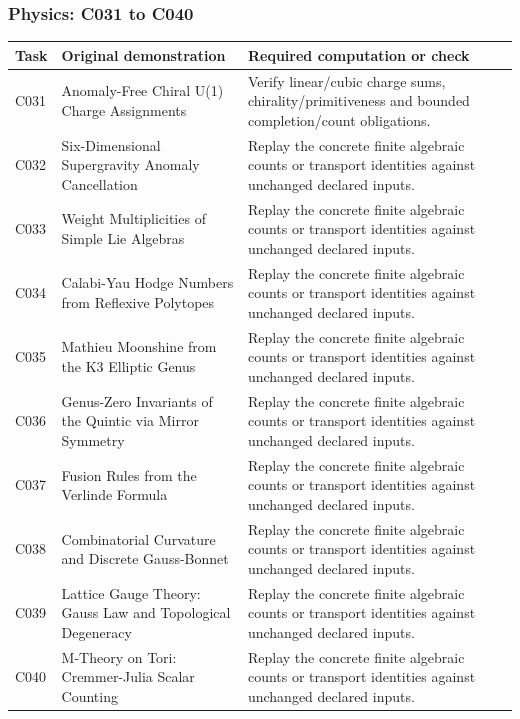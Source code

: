 \documentclass[
  11pt,
]{article}
\begin{document}
\subsubsection{Physics: C031 to C040}\label{physics-c031-to-c040}

\begin{longtable}[]{@{}
  >{\raggedright\arraybackslash}p{}
  >{\raggedright\arraybackslash}p{}
  >{\raggedright\arraybackslash}p{}@{}}
\toprule\noalign{}
\begin{minipage}[b]{\linewidth}\raggedright
Task
\end{minipage} & \begin{minipage}[b]{\linewidth}\raggedright
Original demonstration
\end{minipage} & \begin{minipage}[b]{\linewidth}\raggedright
Required computation or check
\end{minipage} \\
\midrule\noalign{}
\endhead
\bottomrule\noalign{}
\endlastfoot
C031 & Anomaly-Free Chiral U(1) Charge Assignments & Verify linear/cubic
charge sums, chirality/primitiveness and bounded completion/count
obligations. \\
C032 & Six-Dimensional Supergravity Anomaly Cancellation & Replay the
concrete finite algebraic counts or transport identities against
unchanged declared inputs. \\
C033 & Weight Multiplicities of Simple Lie Algebras & Replay the
concrete finite algebraic counts or transport identities against
unchanged declared inputs. \\
C034 & Calabi-Yau Hodge Numbers from Reflexive Polytopes & Replay the
concrete finite algebraic counts or transport identities against
unchanged declared inputs. \\
C035 & Mathieu Moonshine from the K3 Elliptic Genus & Replay the
concrete finite algebraic counts or transport identities against
unchanged declared inputs. \\
C036 & Genus-Zero Invariants of the Quintic via Mirror Symmetry & Replay
the concrete finite algebraic counts or transport identities against
unchanged declared inputs. \\
C037 & Fusion Rules from the Verlinde Formula & Replay the concrete
finite algebraic counts or transport identities against unchanged
declared inputs. \\
C038 & Combinatorial Curvature and Discrete Gauss-Bonnet & Replay the
concrete finite algebraic counts or transport identities against
unchanged declared inputs. \\
C039 & Lattice Gauge Theory: Gauss Law and Topological Degeneracy &
Replay the concrete finite algebraic counts or transport identities
against unchanged declared inputs. \\
C040 & M-Theory on Tori: Cremmer-Julia Scalar Counting & Replay the
concrete finite algebraic counts or transport identities against
unchanged declared inputs. \\
\end{longtable}
\end{document}
